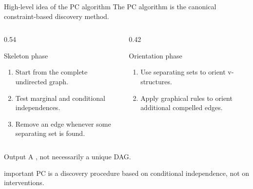 \documentclass[dvipsnames,aspectratio=169,handout]{beamer}
\begin{document}
\begin{frame}{High-level idea of the PC algorithm}
The PC algorithm is the canonical constraint-based discovery method.

\begin{columns}[T]
\begin{column}{0.54\textwidth}
\begin{block}{Skeleton phase}
\begin{enumerate}
    \item Start from the complete undirected graph.
    \item Test marginal and conditional independences.
    \item Remove an edge whenever some separating set is found.
\end{enumerate}
\end{block}
\end{column}
\begin{column}{0.42\textwidth}
\begin{block}{Orientation phase}
\begin{enumerate}
    \item Use separating sets to orient v-structures.
    \item Apply graphical rules to orient additional compelled edges.
\end{enumerate}
\end{block}
\end{column}
\end{columns}
\begin{alertblock}{Output}
A , not necessarily a unique DAG.
\end{alertblock}

\begin{beamercolorbox}[wd=\textwidth,sep=7pt,center,rounded=true,shadow=true]{important}
PC is a discovery procedure based on conditional independence, not on interventions.
\end{beamercolorbox}
\end{frame}
\end{document}
